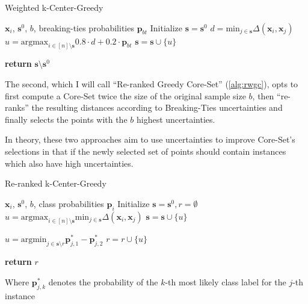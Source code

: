 \documentclass[english,bachelor,ul]{webisthesis} %
\begin{document}
\begin{algorithm}
\caption{Weighted k-Center-Greedy}%
\makeatletter{}\makeatother
\label{alg:wgc}
\begin{algorithmic}


\Require $ \mathbf{x}_i $, $ \mathbf{s}^0 $, $ b $, breaking-ties probabilities $ \mathbf{p}_{bt} $
\State Initialize $ \mathbf{s} = \mathbf{s}^0 $
\Repeat
\State $ d = \text{min}_{j \in \mathbf{s}} \Delta(\mathbf{x}_i, \mathbf{x}_j) $ 
    \State $ u = \text{argmax}_{i \in [n] \setminus \mathbf{s}} 0.8 \cdot d + 0.2 \cdot \mathbf{p}_{bt} $
\State $ \mathbf{s} = \mathbf{s} \cup \{u\} $

\State \textbf{return} $\mathbf{s} \setminus \mathbf{s}^0 $
\end{algorithmic}
\end{algorithm}

The second, which I will call ``Re-ranked Greedy Core-Set'' (\ref{alg:rwgc}), opts to first compute a Core-Set twice the size of the original sample size $b$, then ``re-ranks'' the resulting distances according to Breaking-Ties uncertainties and finally selects the points with the $b$ highest uncertainties.

In theory, these two approaches aim to use uncertainties to improve Core-Set's selections in that if the newly selected set of points should contain instances which also have high uncertainties.

\begin{algorithm}
\caption{Re-ranked k-Center-Greedy}%
\makeatletter{}\makeatother
\label{alg:rwgc}
\begin{algorithmic}


\Require $ \mathbf{x}_i $, $ \mathbf{s}^0 $, $ b $, class probabilities $ \mathbf{p}_i $
\State Initialize $ \mathbf{s} = \mathbf{s}^0, r = \emptyset $
\Repeat
\State $ u = \text{argmax}_{i \in [n] \setminus \mathbf{s}} \text{min}_{j \in \mathbf{s}} \Delta(\mathbf{x}_i, \mathbf{x}_j) $
\State $ \mathbf{s} = \mathbf{s} \cup \{u\} $



\Repeat
\State $ u = \text{argmin}_{j \in \mathbf{s} \setminus r}\mathbf{p}_{j, 1}^* - \mathbf{p}_{j, 2}^* $
\State $ r = r \cup \{u\} $

\State \textbf{return} $ r $
\end{algorithmic}
\end{algorithm}
\noindent Where $ \mathbf{p}_{j, k}^* $ denotes the probability of the $ k $-th most likely class label for the $ j $-th instance 
\end{document}
